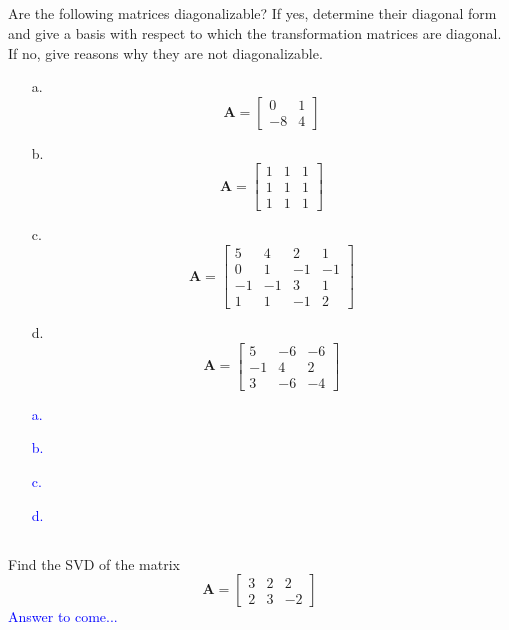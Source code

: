 \documentclass[a4paper,12pt]{article}
\newcommand{\M}[1]{ \begin{bmatrix} #1 \end{bmatrix} }
\newcommand{\matA}{\textbf{A}}
\begin{document}
\subsection{}
Are the following matrices diagonalizable? If yes, determine their diagonal form and give a basis with respect to which the transformation matrices are diagonal.
If no, give reasons why they are not diagonalizable.
\begin{itemize}
 \item [a.] $$\matA = \M{ 0&1\\
                                     -8&4}$$
 \item [b.] $$\matA = \M{1&1&1\\
                                     1&1&1\\
                                     1&1&1}$$
 \item [c.] $$\matA = \M{5&4&2&1\\
                                     0&1&-1&-1\\
                                    -1&-1&3&1\\
                                    1&1&-1&2}$$
 \item [d.] $$\matA = \M{5&-6&-6\\
                                    -1&4&2\\
                                    3&-6&-4}$$
\end{itemize}
\textcolor{blue}{
\begin{itemize}
 \item [a.]
 \item [b.]
 \item [c.]
 \item [d.]
\end{itemize}
}
\subsection{}
Find the SVD of the matrix
$$\matA = \M{3&2&2\\2&3&-2}$$
\textcolor{blue}{
Answer to come...
}
\end{document}
